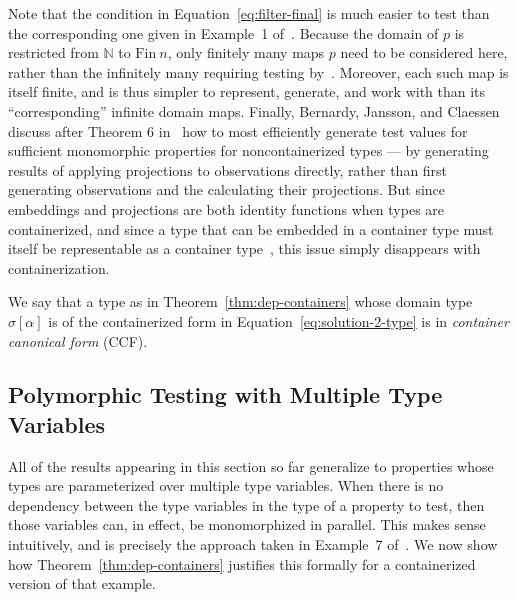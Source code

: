 \documentclass{article}[12 pt]
\theoremstyle{problemstyle}
\begin{document}
Note that the condition in Equation~\ref{eq:filter-final} is much
easier to test than the corresponding one given in Example~1
of~\cite{bjc10}. Because the domain of $p$ is restricted from
$\mathbb{N}$ to $\mathrm{Fin}~n$, only finitely many maps $p$ need to
be considered here, rather than the infinitely many requiring testing
by~\cite{bjc10}. Moreover, each such map is itself finite, and is thus
simpler to represent, generate, and work with than its
``corresponding'' infinite domain maps. Finally, Bernardy, Jansson,
and Claessen discuss after Theorem 6 in~\cite{bjc10} how to most
efficiently generate test values for sufficient monomorphic properties
for noncontainerized types --- by generating results of applying
projections to observations directly, rather than first generating
observations and the calculating their projections. But since
embeddings and projections are both identity functions when types are
containerized, and since a type that can be embedded in a container
type must itself be representable as a container type~\cite{aag03},
this issue simply disappears with containerization.

We say that a type as in Theorem~\ref{thm:dep-containers} whose domain
type $\sigma[\alpha]$ is of the containerized form in
Equation~\ref{eq:solution-2-type} is in {\em container canonical form}
(CCF). 

\subsection{Polymorphic Testing with Multiple Type Variables}

All of the results appearing in this section so far generalize to
properties whose types are parameterized over multiple type
variables. When there is no dependency between the type variables in
the type of a property to test, then those variables can, in effect,
be monomorphized in parallel. This makes sense intuitively, and is
precisely the approach taken in Example~7 of~\cite{bjc10}. We now show
how Theorem~\ref{thm:dep-containers} justifies this formally for a
containerized version of that example.
\end{document}
